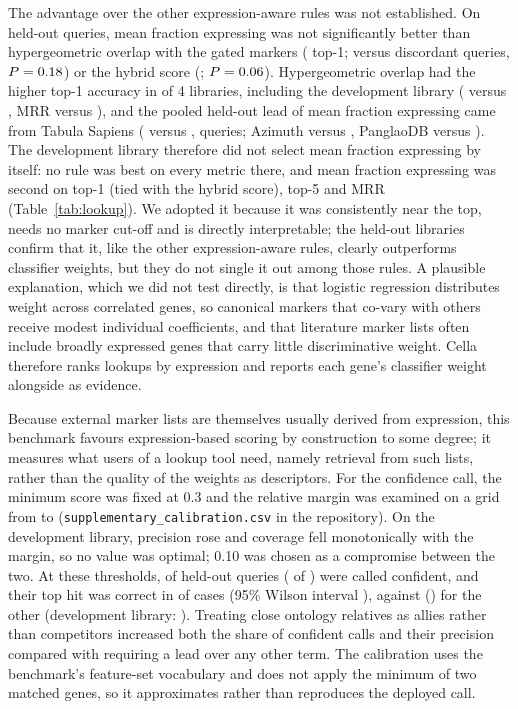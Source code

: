 \documentclass[11pt]{article}
\newcommand{\cella}{Cella}
\begin{document}
The advantage over the other expression-aware rules was not established. On held-out queries, mean fraction expressing was not significantly better than hypergeometric overlap with the gated markers (\lkHyperTopOne{} top-1; \lkHyperDisc{} versus \lkHyperDiscRev{} discordant queries, $P = 0.18{}$) or the hybrid score (\lkHybridTopOne{}; $P = 0.06{}$). Hypergeometric overlap had the higher top-1 accuracy in \lkLibHyperGtExpr{} of 4 libraries, including the development library (\lkDevHyperTopOneX{} versus \lkDevExprTopOneX{}, MRR \lkDevHyperMRR{} versus \lkDevExprMRR{}), and the pooled held-out lead of mean fraction expressing came from Tabula Sapiens (\lkTSExprTopOne{} versus \lkTSHyperTopOne{}, \lkTSN{} queries; Azimuth \lkAzExprTopOne{} versus \lkAzHyperTopOne{}, PanglaoDB \lkPgExprTopOne{} versus \lkPgHyperTopOne{}). The development library therefore did not select mean fraction expressing by itself: no rule was best on every metric there, and mean fraction expressing was second on top-1 (tied with the hybrid score), top-5 and MRR (Table~\ref{tab:lookup}). We adopted it because it was consistently near the top, needs no marker cut-off and is directly interpretable; the held-out libraries confirm that it, like the other expression-aware rules, clearly outperforms classifier weights, but they do not single it out among those rules. A plausible explanation, which we did not test directly, is that logistic regression distributes weight across correlated genes, so canonical markers that co-vary with others receive modest individual coefficients, and that literature marker lists often include broadly expressed genes that carry little discriminative weight. \cella{} therefore ranks lookups by expression and reports each gene's classifier weight alongside as evidence.

Because external marker lists are themselves usually derived from expression, this benchmark favours expression-based scoring by construction to some degree; it measures what users of a lookup tool need, namely retrieval from such lists, rather than the quality of the weights as descriptors. For the confidence call, the minimum score was fixed at 0.3 and the relative margin was examined on a grid from \calMarginMin{} to \calMarginMax{} (\texttt{supplementary\_calibration.csv} in the repository). On the development library, precision rose and coverage fell monotonically with the margin, so no value was optimal; 0.10 was chosen as a compromise between the two. At these thresholds, \calConfFrac{} of held-out queries (\calNConf{} of \lkTest{}) were called confident, and their top hit was correct in \calPrecConf{} of cases (95\% Wilson interval \calPrecConfCI{}), against \calPrecRest{} (\calPrecRestCI{}) for the other \calNRest{} (development library: \calDevPrecConf{}). Treating close ontology relatives as allies rather than competitors increased both the share of confident calls and their precision compared with requiring a lead over any other term. The calibration uses the benchmark's feature-set vocabulary and does not apply the minimum of two matched genes, so it approximates rather than reproduces the deployed call.
\end{document}

